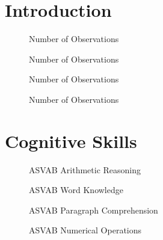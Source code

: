 \section{Introduction}
\begin{figure}[htp]\centering
\caption{Number of Observations}
\end{figure}

\begin{figure}[htp]\centering
\caption{Number of Observations}
\end{figure}

\begin{figure}[htp]\centering
\caption{Number of Observations}
\end{figure}

\begin{figure}[htp]\centering
\caption{Number of Observations}
\end{figure}

\section{Cognitive Skills}
\begin{figure}[htp]\centering
\caption{ASVAB Arithmetic Reasoning}
\end{figure}

\begin{figure}[htp]\centering
\caption{ASVAB Word Knowledge}
\end{figure}

\begin{figure}[htp]\centering
\caption{ASVAB Paragraph Comprehension}
\end{figure}

\begin{figure}[htp]\centering
\caption{ASVAB Numerical Operations}
\end{figure}

